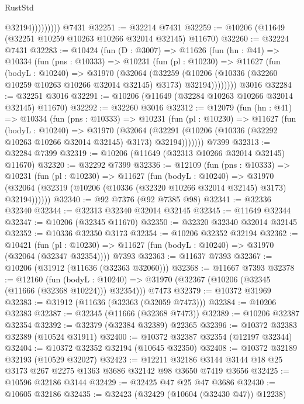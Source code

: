 \begin{lexlean}{RustStd}
\begin{coremodule}
                      @32194)))))))))
    @7431
@32251 := @32214 @7431
@32259 := @10206 (@11649 (@32251 @10259 @10263 @10266 @32014 @32145) @11670)
@32260 := @32224 @7431
@32283 := @10424
    (fun (D : @3007) =>
    @11626
      (fun (hn : @41) =>
      @10334
        (fun (pns : @10333) =>
        @10231
          (fun (pl : @10230) =>
          @11627
            (fun (bodyL : @10240) =>
            @31970
              (@32064
                (@32259
                  (@10206 (@10336 (@32260 @10259 @10263 @10266 @32014 @32145) @3173) @32194))))))))
    @3016
@32284 := @32251 @3016
@32291 := @10206 (@11649 (@32284 @10263 @10266 @32014 @32145) @11670)
@32292 := @32260 @3016
@32312 := @12079
    (fun (hn : @41) =>
    @10334
      (fun (pns : @10333) =>
      @10231
        (fun (pl : @10230) =>
        @11627
          (fun (bodyL : @10240) =>
          @31970
            (@32064
              (@32291 (@10206 (@10336 (@32292 @10263 @10266 @32014 @32145) @3173) @32194)))))))
    @7399
@32313 := @32284 @7399
@32319 := @10206 (@11649 (@32313 @10266 @32014 @32145) @11670)
@32320 := @32292 @7399
@32336 := @12109
    (fun (pns : @10333) =>
    @10231
      (fun (pl : @10230) =>
      @11627
        (fun (bodyL : @10240) =>
        @31970 (@32064 (@32319 (@10206 (@10336 (@32320 @10266 @32014 @32145) @3173) @32194))))))
@32340 := @92 @7376 (@92 @7385 @98)
@32341 := @32336 @32340
@32344 := @32313 @32340 @32014 @32145
@32345 := @11649 @32344
@32347 := @10206 (@32345 @11670)
@32350 := @32320 @32340 @32014 @32145
@32352 := @10336 @32350 @3173
@32354 := @10206 @32352 @32194
@32362 := @10421
    (fun (pl : @10230) => @11627 (fun (bodyL : @10240) => @31970 (@32064 (@32347 @32354))))
    @7393
@32363 := @11637 @7393
@32367 := @10206 (@31912 (@11636 (@32363 @32060)))
@32368 := @11667 @7393
@32378 := @12160
    (fun (bodyL : @10240) => @31970 (@32367 (@10206 (@32345 (@11666 (@32368 @10224))) @32354)))
    @7473
@32379 := @10372 @31969
@32383 := @31912 (@11636 (@32363 (@32059 @7473)))
@32384 := @10206 @32383
@32387 := @32345 (@11666 (@32368 @7473))
@32389 := @10206 @32387 @32354
@32392 := @32379 (@32384 @32389) @22365
@32396 := @10372 @32383 @32389 (@10524 @31911)
@32400 := @10372 @32387 @32354 (@12197 @32344)
@32404 := @10372 @32352 @32194 (@10645 @32350)
@32408 := @10372 @32189 @32193 (@10529 @32027)
@32423 := @12211
    @32186
    @3144
    @3144
    @18
    @25
    @3173
    @267
    @2275
    @1363
    @3686
    @32142
    @98
    @3650
    @7419
    @3656
@32425 := @10596 @32186 @3144
@32429 := @32425 @47 @25 @47 @3686
@32430 := @10605 @32186
@32435 := @32423 (@32429 (@10604 (@32430 @47)) @12238)

\end{coremodule}
\end{lexlean}
